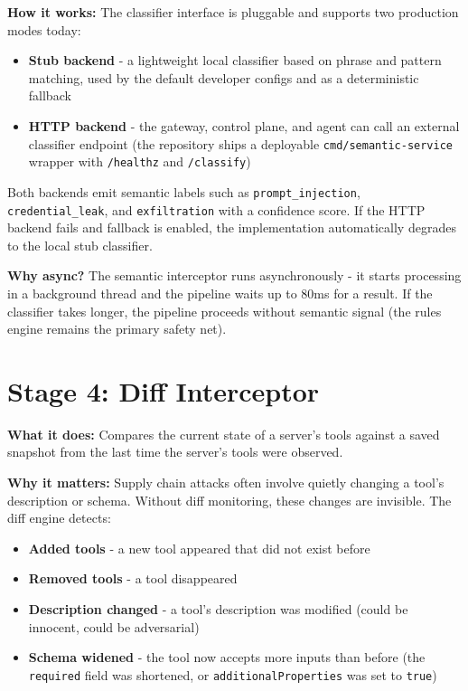 \documentclass[12pt,a4paper]{report}
\begin{document}
\textbf{How it works:} The classifier interface is pluggable and supports two
production modes today:
\begin{itemize}
  \item \textbf{Stub backend} - a lightweight local classifier based on phrase
    and pattern matching, used by the default developer configs and as a
    deterministic fallback
  \item \textbf{HTTP backend} - the gateway, control plane, and agent can call
    an external classifier endpoint (the repository ships a deployable
    \texttt{cmd/semantic-service} wrapper with \texttt{/healthz} and
    \texttt{/classify})
\end{itemize}

Both backends emit semantic labels such as \texttt{prompt\_injection},
\texttt{credential\_leak}, and \texttt{exfiltration} with a confidence score.
If the HTTP backend fails and fallback is enabled, the implementation
automatically degrades to the local stub classifier.

\textbf{Why async?} The semantic interceptor runs asynchronously - it starts
processing in a background thread and the pipeline waits up to 80ms for a
result. If the classifier takes longer, the pipeline proceeds without semantic
signal (the rules engine remains the primary safety net).

\section{Stage 4: Diff Interceptor}

\textbf{What it does:} Compares the current state of a server's tools against
a saved snapshot from the last time the server's tools were observed.

\textbf{Why it matters:} Supply chain attacks often involve quietly changing a
tool's description or schema. Without diff monitoring, these changes are
invisible. The diff engine detects:

\begin{itemize}
  \item \textbf{Added tools} - a new tool appeared that did not exist before
  \item \textbf{Removed tools} - a tool disappeared
  \item \textbf{Description changed} - a tool's description was modified
    (could be innocent, could be adversarial)
  \item \textbf{Schema widened} - the tool now accepts more inputs than before
    (the \texttt{required} field was shortened, or \texttt{additionalProperties}
    was set to \texttt{true})
\end{itemize}
\end{document}
